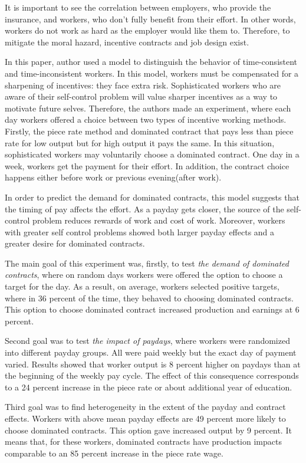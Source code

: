 \documentclass[a4paper,12pt]{article}
\begin{document}
It is important to see the correlation between employers, who provide the insurance, and workers, who don't fully benefit from their effort. In other words, workers do not work as hard as the employer would like them to. Therefore, to mitigate the moral hazard, incentive contracts and job design exist. 

In this paper, author used a model to distinguish the behavior of time-consistent and time-inconsistent workers. In this model, workers must be compensated for a sharpening of incentives: they face extra risk. Sophisticated workers who are aware of their self-control problem will value sharper incentives as a way to motivate future selves. Therefore, the authors made an experiment, where each day workers offered a choice between two types of incentive working methods. Firstly, the piece rate method and dominated contract that pays less than piece rate for low output but for high output it pays the same. In this situation, sophisticated workers may voluntarily choose a dominated contract. One day in a week, workers get the payment for their effort. In addition, the contract choice happens either before work or previous evening(after work). 

In order to predict the demand for dominated contracts, this model suggests that the timing of pay affects the effort. As a payday gets closer, the source of the self-control problem reduces rewards of work and cost of work. Moreover, workers with greater self control problems showed both larger payday effects and a greater desire for dominated contracts. 

The main goal of this experiment was, firstly, to test \textit{the demand of dominated contracts}, where on random days workers were offered the option to choose a target for the day. As a result, on average, workers selected positive targets, where in 36 percent of the time, they behaved to choosing dominated contracts.  This option to choose dominated contract increased production and earnings at 6 percent.

Second goal was to test \textit{the impact of paydays}, where workers were randomized into different payday groups. All were paid weekly but the exact day of payment varied. Results showed that worker output is 8 percent higher on paydays than at the beginning of the weekly pay cycle. The effect of this consequence corresponds to a 24 percent increase in the piece rate or about additional year of education. 

Third goal was to find heterogeneity in the extent of the payday and contract effects. Workers with above mean payday effects are 49 percent more likely to choose dominated contracts. This option gave increased output by 9 percent. It means that, for these workers, dominated contracts have production impacts comparable to an 85 percent increase in the piece rate wage. 
\end{document}
